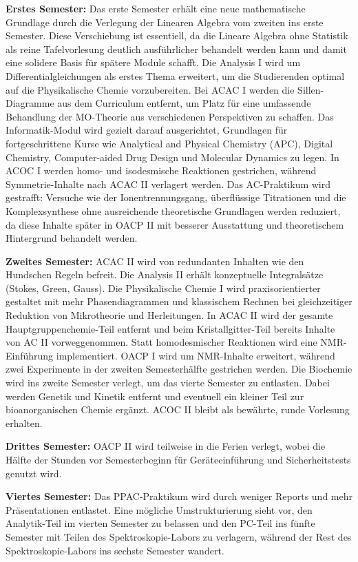 \documentclass[a4paper]{article}
\begin{document}
\textbf{Erstes Semester:} Das erste Semester erhält eine neue mathematische Grundlage durch die Verlegung der Linearen Algebra vom zweiten ins erste Semester. Diese Verschiebung ist essentiell, da die Lineare Algebra ohne Statistik als reine Tafelvorlesung deutlich ausführlicher behandelt werden kann und damit eine solidere Basis für spätere Module schafft. Die Analysis I wird um Differentialgleichungen als erstes Thema erweitert, um die Studierenden optimal auf die Physikalische Chemie vorzubereiten. Bei ACAC I werden die Sillen-Diagramme aus dem Curriculum entfernt, um Platz für eine umfassende Behandlung der MO-Theorie aus verschiedenen Perspektiven zu schaffen. Das Informatik-Modul wird gezielt darauf ausgerichtet, Grundlagen für fortgeschrittene Kurse wie Analytical and Physical Chemistry (APC), Digital Chemistry, Computer-aided Drug Design und Molecular Dynamics zu legen. In ACOC I werden homo- und isodesmische Reaktionen gestrichen, während Symmetrie-Inhalte nach ACAC II verlagert werden. Das AC-Praktikum wird gestrafft: Versuche wie der Ionentrennungsgang, überflüssige Titrationen und die Komplexsynthese ohne ausreichende theoretische Grundlagen werden reduziert, da diese Inhalte später in OACP II mit besserer Ausstattung und theoretischem Hintergrund behandelt werden.

\textbf{Zweites Semester:} ACAC II wird von redundanten Inhalten wie den Hundschen Regeln befreit. Die Analysis II erhält konzeptuelle Integralsätze (Stokes, Green, Gauss). Die Physikalische Chemie I wird praxisorientierter gestaltet mit mehr Phasendiagrammen und klassischem Rechnen bei gleichzeitiger Reduktion von Mikrotheorie und Herleitungen. In ACAC II wird der gesamte Hauptgruppenchemie-Teil entfernt und beim Kristallgitter-Teil bereits Inhalte von AC II vorweggenommen. Statt homodesmischer Reaktionen wird eine NMR-Einführung implementiert. OACP I wird um NMR-Inhalte erweitert, während zwei Experimente in der zweiten Semesterhälfte gestrichen werden. Die Biochemie wird ins zweite Semester verlegt, um das vierte Semester zu entlasten. Dabei werden Genetik und Kinetik entfernt und eventuell ein kleiner Teil zur bioanorganischen Chemie ergänzt. ACOC II bleibt als bewährte, runde Vorlesung erhalten.

\textbf{Drittes Semester:} OACP II wird teilweise in die Ferien verlegt, wobei die Hälfte der Stunden vor Semesterbeginn für Geräteeinführung und Sicherheitstests genutzt wird.

\textbf{Viertes Semester:} Das PPAC-Praktikum wird durch weniger Reports und mehr Präsentationen entlastet. Eine mögliche Umstrukturierung sieht vor, den Analytik-Teil im vierten Semester zu belassen und den PC-Teil ins fünfte Semester mit Teilen des Spektroskopie-Labors zu verlagern, während der Rest des Spektroskopie-Labors ins sechste Semester wandert.
\end{document}
